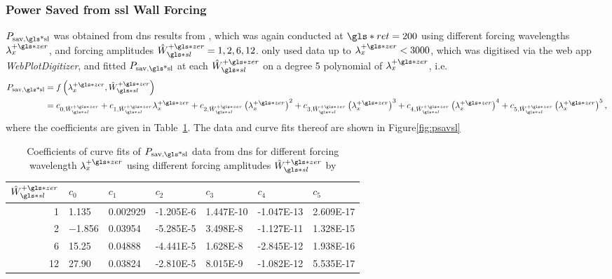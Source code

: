 \subsubsection{Power Saved from \gls{ssl} Wall Forcing}
$P_\text{sav,\gls*{sl}} $ was obtained from \gls{dns} results from \textcite{viotti2009}, which was again conducted at $\gls*{ret}=200$ using different forcing wavelengths $\lambda_x\pz$, and forcing amplitudes $\hat{W}\pz\ssl=1,2,6,12$. \textcite{chernyshenko2013} only used data up to $\lambda_x\pz<3000$, which was digitised via the web app \textit{WebPlotDigitizer}, and fitted $P_\text{sav,\gls*{sl}}$ at each $\hat{W}\pz\ssl$ on a degree 5 polynomial of $\lambda_x\pz$, i.e.
\begin{align}
	P_\text{sav,\gls*{sl}} &= f\left(\lambda_x\pz,\hat{W}\pz\ssl\right)\\
			       &= c_{0,\hat{W}\pz\ssl} + c_{1,\hat{W}\pz\ssl}\lambda_x\pz+c_{2,\hat{W}\pz\ssl}\left(\lambda_x\pz\right)^{2}+c_{3,\hat{W}\pz\ssl}\left(\lambda_x\pz\right)^{3}+c_{4,\hat{W}\pz\ssl}\left(\lambda_x\pz\right)^{4}+c_{5,\hat{W}\pz\ssl}\left(\lambda_x\pz\right)^{5}\label{eq:psavsl}
,\end{align}
where the coefficients are given in Table~\ref{tab:psavslcoeff}. The data and curve fits thereof are shown in Figure\ref{fig:psavsl}
\begin{table}[htbp]
	\centering
	\begin{tabular}{r|llllll}
		$\hat{W}\pz\ssl$ & $c_0$ & $c_1$ & $c_2$ & $c_3$ & $c_4$ & $c_5$\\
		\hline
		1 & \num{1.135} &  \num{0.002929} &  \num{-1.205E-6} &  \num{1.447E-10} &  \num{-1.047E-13} &  \num{2.609E-17}\\
		2 & \num{-1.856} &  \num{0.03954} &  \num{-5.285E-5} &  \num{3.498E-8} &  \num{-1.127E-11} &  \num{1.328E-15}\\
		6 & \num{15.25} &  \num{0.04888} &  \num{-4.441E-5} &  \num{1.628E-8} &  \num{-2.845E-12} &  \num{1.938E-16}\\
		12 & \num{27.90} &  \num{0.03824} &  \num{-2.810E-5} &  \num{8.015E-9} &  \num{-1.082E-12} &  \num{5.535E-17}
	\end{tabular}
	\caption[Coefficients of curvefits of $P_\text{sav,\gls*{sl}} $]{Coefficients of curve fits of $P_\text{sav,\gls*{sl}} $ data from \gls{dns} for different forcing wavelength $\lambda_x\pz$ using different forcing amplitudes $\hat{W}\pz\ssl$ by \textcite{viotti2009}}
	\label{tab:psavslcoeff}
\end{table}

